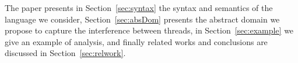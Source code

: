 The paper presents in Section~\ref{sec:syntax} the syntax and semantics of the language we consider, Section~\ref{sec:absDom} presents the abstract domain we propose to capture the interference between threads, in Section~\ref{sec:example} we give an example of analysis, and finally related works and conclusions are discussed in Section~\ref{sec:relwork}. 


% 
